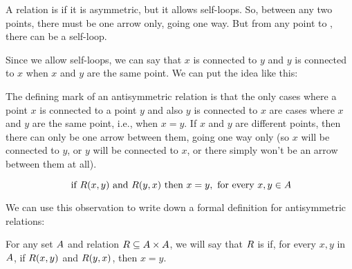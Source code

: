 \documentclass[../../../main.tex]{subfiles}
\begin{document}
A relation is  if it is asymmetric, but it allows self-loops. So, between any two  points, there must be one arrow only, going one way. But from any point to , there can be a self-loop.

Since we allow self-loops, we can say that $x$ is connected to $y$ and $y$ is connected to $x$ when $x$ and $y$ are the same point. We can put the idea like this: 

\begin{aside}
  \begin{remark}
    The defining mark of an antisymmetric relation is that the only cases where a point $x$ is connected to a point $y$ and also $y$ is connected to $x$ are cases where $x$ and $y$ are the same point, i.e., when $x = y$. If $x$ and $y$ are different points, then there can only be one arrow between them, going one way only (so $x$ will be connected to $y$, or $y$ will be connected to $x$, or there simply won't be an arrow between them at all).
  \end{remark}
\end{aside}

\begin{equation*}
  \text{ if } R(x, y) \text{ and } R(y, x) \text{ then } x = y, \text{ for every } x, y \in A
\end{equation*}

We can use this observation to write down a formal definition for antisymmetric relations:

\begin{fdefinition}
  \label{def:antisymmetric-relations}
  For any set $A$ and relation $R \subseteq A \times A$, we will say that $R$ is  if, for every $x, y$ in $A$, if $R(x, y)$ and $R(y, x)$, then $x = y$.
\end{fdefinition}
\end{document}
